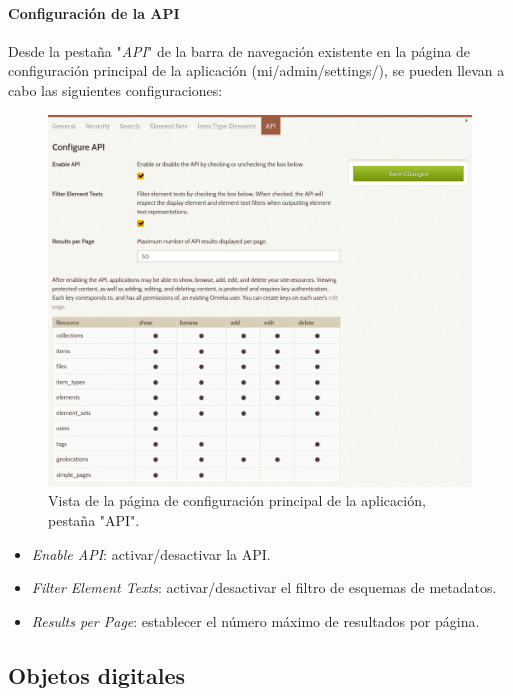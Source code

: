 \documentclass[
]{article}
\providecommand{\tightlist}{%
  \setlength{\itemsep}{0pt}\setlength{\parskip}{0pt}}
\begin{document}
\hypertarget{configuraciuxf3n-de-la-api}{%
\paragraph{Configuración de la API}\label{configuraciuxf3n-de-la-api}}

Desde la pestaña "\emph{API}" de la barra de navegación existente en la
página de configuración principal de la aplicación
({mi/admin/settings/}), se pueden llevan a cabo las siguientes
configuraciones:

\begin{figure}
\hypertarget{settings-api}{%
\centering
\includegraphics{../_static/images/settings-api.png}
\caption{Vista de la página de configuración principal de la aplicación,
pestaña "API".}\label{settings-api}
}
\end{figure}

\begin{itemize}
\tightlist
\item
  \emph{Enable API}: activar/desactivar la API.
\item
  \emph{Filter Element Texts}: activar/desactivar el filtro de esquemas
  de metadatos.
\item
  \emph{Results per Page}: establecer el número máximo de resultados por
  página.
\end{itemize}

\hypertarget{objetos-digitales}{%
\subsection{Objetos digitales}\label{objetos-digitales}}
\end{document}
